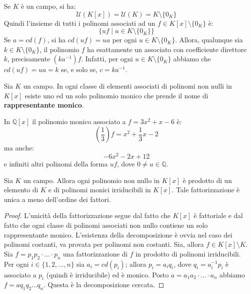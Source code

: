 Se $K$ è un campo, si ha:
\begin{displaymath}
	\mathcal{U}(K[x]) = \mathcal{U}(K) = K \setminus \{0_{K}\}
\end{displaymath}
Quindi l'insieme di tutti i polinomi associati ad un $f \in K[x] \setminus \{0_{K}\}$ è:
\begin{displaymath}
	\{uf \; | \; u \in K \setminus \{0_{K}\} \}
\end{displaymath}
Se $a = cd(f)$, si ha $cd(uf)=ua$ per ogni $u \in K \setminus \{0_{K}\}$. Allora, qualunque sia $k \in K \setminus \{0_{K}\}$, il polinomio $f$ ha esattamente un associato con coefficiente direttore $k$, precisamente $(ka^{-1})f$. Infatti, per ogni $u \in K \setminus \{0_{K}\}$ abbiamo che $cd(uf) =ua = k$ se, e solo se, $c = ka^{-1}$.

\begin{propbox}
	Sia $K$ un campo. In ogni classe di elementi associati di polinomi non nulli in $K[x]$ esiste uno ed un solo polinomio monico che prende il nome di \textbf{rappresentante monico}.
\end{propbox}


\begin{example}
	In $\mathbb{Q}[x]$ il polinomio monico associato a $f = 3x^{2}+x-6$ è:
	\begin{displaymath}
		(\frac{1}{3})f = x^{2}+ \frac{1}{3}x -2
	\end{displaymath}
	ma anche:
	\begin{displaymath}
		-6x^{2}-2x+12
	\end{displaymath}
	e infiniti altri polinomi della forma $uf$, dove $0 \neq u \in \mathbb{Q}$.
\end{example}

\begin{propbox}
	Sia $K$ un campo. Allora ogni polinomio non nullo in $K[x]$ è prodotto di un elemento di $K$ e di polinomi monici irriducibili in $K[x]$. Tale fattorizzazione è unica a meno dell’ordine dei fattori.
\end{propbox}

\begin{proof}
	L'unicità della fattorizzazione segue dal fatto che $K[x]$ è fattoriale e dal fatto che ogni classe di polinomi associati non nullo contiene un solo rappresentante monico. L'esistenza della decomposizione è ovvia nel caso dei polinomi costanti, va provata per polinomi non costanti. Sia, allora $f \in K[x] \setminus K$. Sia $f=p_{1}p_{2}\cdot \ldots \cdot p_{n}$ una fattorizzazione di $f$ in prodotto di polinomi irriducibili. Per ogni $i \in \{1,2,\ldots, n\}$ sia $a_{i} = cd (p_{i})$; allora $p_{i}=a_{i}q_{i}$, dove $q_{i}=a_{i}^{-1}p_{i}$ è associato a $p_{i}$ (quindi è irriducibile) ed è monico. Posto $a= a_{1}a_{2}\cdot \ldots \cdot a_{n}$ abbiamo $f=aq_{1}q_{2}\ldots q_{n}$. Questa è la decomposizione cercata.
\end{proof}

